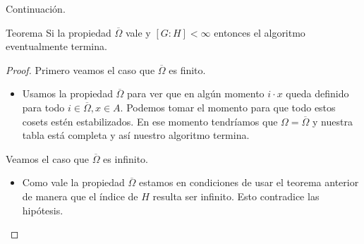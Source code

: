 \documentclass[aspectratio=169, 9pt]{beamer}
\newcommand{\ol}{\overline}
\begin{document}
\begin{frame}[fragile]{Continuación.}
	\begin{alertblock}{Teorema}
		Si la propiedad $\ol \Omega$ vale y $[G:H] < \infty$ entonces el algoritmo eventualmente termina.
	\end{alertblock}
	
	
	\pause
\begin{proof}
	\pause
		Primero veamos el caso que $\ol \Omega$ es finito.
	\begin{itemize}
		\pause
		\item Usamos la propiedad $\ol \Omega$ para ver que en algún momento $i \cdot x$ queda definido para todo $i \in \ol\Omega, x \in A$.
		\pause 
		Podemos tomar el momento para que todo estos cosets estén estabilizados.
		\pause
		En ese momento tendríamos que $\Omega = \ol \Omega$ y nuestra tabla está completa y así nuestro algoritmo termina.
	\end{itemize}
	\pause
	Veamos el caso que $\ol \Omega$ es infinito.
	\begin{itemize}
		\pause
		\item Como vale la propiedad $\ol \Omega$ estamos en condiciones de usar el teorema anterior de manera que el índice de $H$ resulta ser infinito.
		Esto contradice las hipótesis.
		
	\end{itemize}
		
\end{proof}
	
	
\end{frame}
\end{document}
